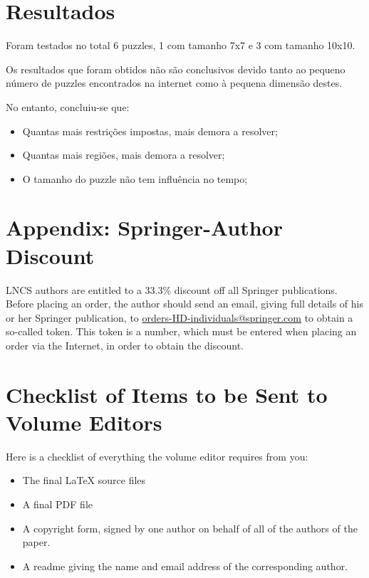 \documentclass[runningheads,a4paper]{llncs}
\begin{document}
\section{Resultados}

Foram testados no total 6 puzzles, 1 com tamanho 7x7 e 3 com tamanho 10x10.

Os resultados que foram obtidos não são conclusivos devido tanto ao pequeno número de puzzles encontrados na internet como à pequena dimensão destes.

No entanto, concluiu-se que:

\begin{itemize}
  \item Quantas mais restrições impostas, mais demora a resolver;
  \item Quantas mais regiões, mais demora a resolver;
  \item O tamanho do puzzle não tem influência no tempo;
\end{itemize}



\section*{Appendix: Springer-Author Discount}

LNCS authors are entitled to a 33.3\% discount off all Springer
publications. Before placing an order, the author should send an email, 
giving full details of his or her Springer publication,
to \url{orders-HD-individuals@springer.com} to obtain a so-called token. This token is a
number, which must be entered when placing an order via the Internet, in
order to obtain the discount.

\section{Checklist of Items to be Sent to Volume Editors}
Here is a checklist of everything the volume editor requires from you:


\begin{itemize}
\settowidth{\leftmargin}{{\Large$\square$}}\advance\leftmargin{}
\itemsep8pt\relax
\renewcommand\labelitemi{{\lower1.5pt\hbox{\Large$\square$}}}

\item The final \LaTeX{} source files
\item A final PDF file
\item A copyright form, signed by one author on behalf of all of the
authors of the paper.
\item A readme giving the name and email address of the
corresponding author.
\end{itemize}
\end{document}
